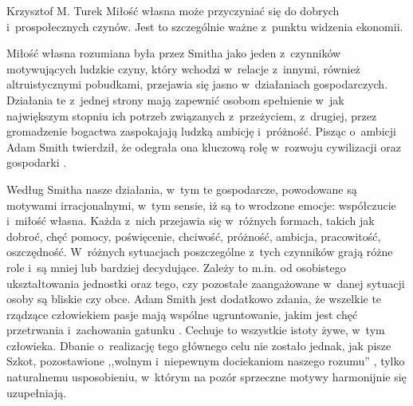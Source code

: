 \begin{artplenv}{Krzysztof M. Turek}
Miłość własna może przyczyniać się do dobrych i~prospołecznych czynów. Jest to szczególnie ważne z~punktu widzenia
ekonomii. 


Miłość własna rozumiana była przez Smitha jako jeden z~czynników motywujących ludzkie czyny, który
wchodzi w~relacje z~innymi, również altruistycznymi pobudkami, przejawia się jasno w~działaniach
gospodarczych. Działania te z~jednej
strony mają zapewnić osobom spełnienie w~jak największym stopniu ich potrzeb związanych z~przeżyciem, z~drugiej, przez
gromadzenie bogactwa zaspokajają ludzką ambicję i~próżność. Pisząc o~ambicji Adam Smith twierdził, że odegrała ona
kluczową rolę w~rozwoju cywilizacji oraz gospodarki
\parencite[s.~164]{smith_theory_1969}.

Według Smitha nasze działania, w~tym te gospodarcze, powodowane są motywami irracjonalnymi, w~tym sensie, iż są to
wrodzone emocje: współczucie i~miłość własna. Każda z~nich przejawia się w~różnych formach, takich jak dobroć, chęć
pomocy, poświęcenie, chciwość, próżność, ambicja, pracowitość, oszczędność. W~różnych sytuacjach poszczególne z~tych
czynników grają różne role i~są mniej lub bardziej decydujące. Zależy to m.in. od osobistego ukształtowania jednostki
oraz tego, czy pozostałe zaangażowane w~danej sytuacji osoby są bliskie czy obce. Adam Smith jest dodatkowo zdania, że
wszelkie te rządzące człowiekiem pasje mają wspólne ugruntowanie, jakim jest chęć przetrwania i~zachowania gatunku
\parencite[s.~69]{smith_theory_1969}.
Cechuje to wszystkie istoty żywe, w~tym człowieka. Dbanie o~realizację
tego głównego celu nie zostało jednak, jak pisze Szkot, pozostawione ,,wolnym i~niepewnym dociekaniom naszego rozumu''
\parencite[s.~69]{smith_theory_1969},
tylko naturalnemu usposobieniu, w~którym na pozór sprzeczne motywy
harmonijnie się uzupełniają. 


\end{artplenv}
